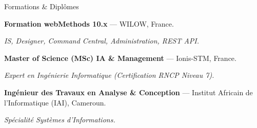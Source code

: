 \begin{rubric}{Formations \& Diplômes}

\entry*[2025]%
	\textbf{Formation webMethods 10.x} --- WILOW, France.\par
	\emph{IS, Designer, Command Central, Administration, REST API.}

\entry*[2022 -- 2024]%
	\textbf{Master of Science (MSc) IA \& Management} --- Ionis-STM, France.\par
	\emph{Expert en Ingénierie Informatique (Certification RNCP Niveau 7).}

\entry*[2014 -- 2017]%
	\textbf{Ingénieur des Travaux en Analyse \& Conception} --- Institut Africain de l'Informatique (IAI), Cameroun.\par
	\emph{Spécialité Systèmes d'Informations.}

\end{rubric}
